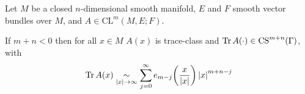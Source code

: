 \begin{Theorem}
    Let $M$ be a closed $n$-dimensional smooth manifold, $E$ and $F$ smooth
    vector bundles over $M$, and $A\in\mathrm{CL}^m(M,E; F)$.

    If $m+n<0$ then for all $x\in M$ $A(x)$ is trace-class and $\operatorname{Tr} A(\cdot)\in
    \mathrm{CS}^{m+n}(\Gamma)$, with
    \begin{align*}
        \operatorname{Tr} A(x)\mathrel{\underset{\left|x\right|\to\infty}{\sim}}
        \sum_{j=0}^{\infty} e_{m-j}\!\left(\frac{x}{\left|x\right|}\right)
                            \left|x\right|^{m+n-j}
    \end{align*}
\end{Theorem}
